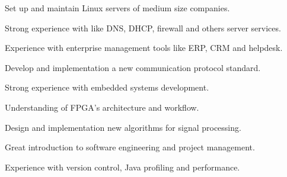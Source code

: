 \documentclass[]{deedy-resume-openfont}
\begin{document}
\begin{minipage}[t]{0.66\textwidth}
\begin{tightemize}
\item Set up and maintain Linux servers of medium size companies.
\item Strong experience with like DNS, DHCP, firewall and others server services.
\item Experience with enterprise management tools like ERP, CRM and helpdesk.
\end{tightemize}
\sectionsep

\begin{tightemize}
\item Develop and implementation a new communication protocol standard.
\item Strong experience with embedded systems development.
\item Understanding of FPGA's architecture and workflow.
\end{tightemize}
\sectionsep

\begin{tightemize}
\item Design and implementation new algorithms for signal processing.
\item Great introduction to software engineering and project management.
\item Experience with version control, Java profiling and performance.
\end{tightemize}
\sectionsep
\end{minipage} 
\end{document}
